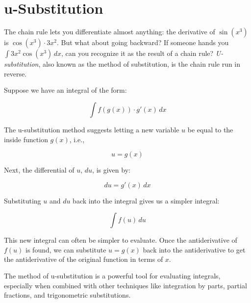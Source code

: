 \chapter{u-Substitution}

The chain rule lets you differentiate almost anything: the derivative of
$\sin(x^3)$ is $\cos(x^3) \cdot 3x^2$. But what about going backward? If
someone hands you $\int 3x^2 \cos(x^3)\,dx$, can you recognize it as the
result of a chain rule? \emph{U-substitution}, also known as the method of
substitution, is the chain rule run in reverse.

Suppose we have an integral of the form:

\begin{equation}
\int f(g(x)) \cdot g'(x) \, dx
\end{equation}

The u-substitution method suggests letting a new variable $u$ be equal to the inside function $g(x)$, i.e., 

\begin{equation}
u = g(x)
\end{equation}

Next, the differential of $u$, $du$, is given by:

\begin{equation}
du = g'(x) \, dx
\end{equation}

Substituting $u$ and $du$ back into the integral gives us a simpler integral:

\begin{equation}
\int f(u) \, du
\end{equation}

This new integral can often be simpler to evaluate. Once the antiderivative of 
$f(u)$ is found, we can substitute $u=g(x)$ back into the antiderivative to 
get the antiderivative of the original function in terms of $x$.

The method of u-substitution is a powerful tool for evaluating integrals, 
especially when combined with other techniques like integration by parts, 
partial fractions, and trigonometric substitutions.

